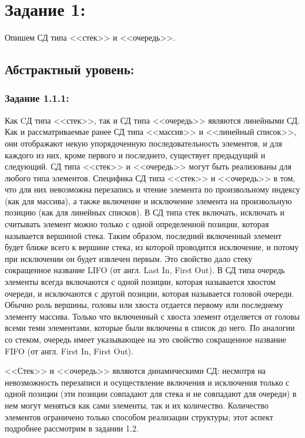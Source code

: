 \documentclass[12pt]{article}
\begin{document}
	\setcounter{secnumdepth}{-1} 
	\tableofcontents
	\newpage
	
	{\parskip=0.15cm
	
	\section{Задание 1:}
	\label{task_1}
	Опишем СД типа <<стек>> и <<очередь>>.
	
	\subsection{Абстрактный уровень:}
	\label{task_1_1}
	\subsubsection{Задание 1.1.1:}
	\label{task_1_1_1}
	
	Как CД типа <<стек>>, так и СД типа <<очередь>> являются линейными СД. Как и рассматриваемые ранее СД типа <<массив>> и <<линейный список>>, они отображают некую упорядоченную последовательность элементов, и для каждого из них, кроме первого и последнего, существует предыдущий и следующий. СД типа <<стек>> и <<очередь>> могут быть реализованы для любого типа элементов. Специфика СД типа <<стек>> и <<очередь>> в том, что для них невозможна перезапись и чтение элемента по произвольному индексу (как для массива), а также включение и исключение элемента на произвольную позицию (как для линейных списков). В СД типа стек включать, исключать и считывать элемент можно только с одной определенной позиции, которая называется вершиной стека. Таким образом, последний включенный элемент будет ближе всего к вершине стека, из которой проводится исключение, и потому при исключении он будет извлечен первым. Это свойство дало стеку сокращенное название LIFO (от англ. Last In, First Out). В СД типа очередь элементы всегда включаются с одной позиции, которая называется хвостом очереди, и исключаются с другой позиции, которая называется головой очереди. Обычно роль вершины, головы или хвоста отдается первому или последнему элементу массива. Только что включенный с хвоста элемент отделяется от головы всеми теми элементами, которые были включены в список до него. По аналогии со стеком, очередь имеет указывающее на это свойство сокращенное название FIFO (от англ. First In, First Out).
	
	<<Стек>> и <<очередь>> являются динамическими СД: несмотря на невозможность перезаписи и осуществление включения и исключения только с одной позиции (эти позиции совпадают для стека и не совпадают для очереди) в нем могут меняться как сами элементы, так и их количество. Количество элементов ограничено только способом реализации структуры; этот аспект подробнее рассмотрим в задании 1.2. 
	
}
\end{document}
